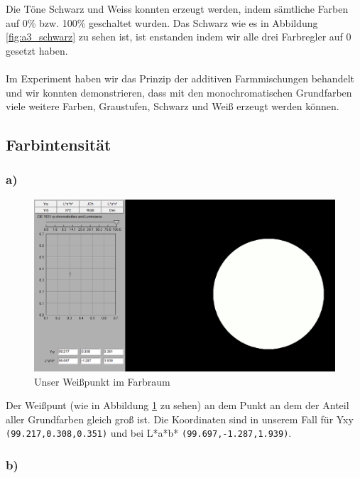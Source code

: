 \documentclass[a4paper]{article}
\begin{document}
\noindent Die Töne Schwarz und Weiss konnten erzeugt werden, indem sämtliche Farben auf 0\% bzw. 100\% geschaltet wurden. Das Schwarz wie es in Abbildung \ref{fig:a3_schwarz} zu sehen ist, ist enstanden indem wir alle drei Farbregler auf 0 gesetzt haben. \\ \\

\noindent Im Experiment haben wir das Prinzip der additiven Farmmischungen behandelt und wir konnten demonstrieren, dass mit den monochromatischen Grundfarben viele weitere Farben, Graustufen, Schwarz und Weiß erzeugt werden können.

\newpage
\subsection{Farbintensität}

\subsubsection*{a)}

\begin{figure}[H]
    \centering
    \includegraphics[width=0.8\columnwidth]{images/A4_a_Weisspunkt.PNG}
    \caption{Unser Weißpunkt im Farbraum}
    \label{fig:A3a}
\end{figure}

Der Weißpunt (wie in Abbildung \ref{fig:A3a} zu sehen) an dem Punkt an dem der Anteil aller Grundfarben gleich groß ist. Die Koordinaten sind in unserem Fall für Yxy \texttt{(99.217,0.308,0.351)} und bei L*a*b* \texttt{(99.697,-1.287,1.939)}.

\subsubsection*{b)}
\end{document}
